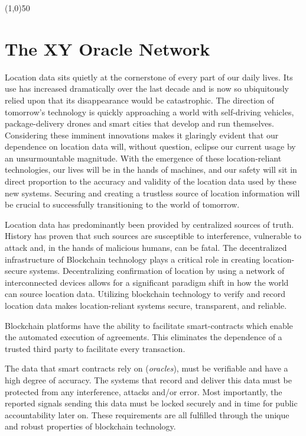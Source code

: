 \documentclass{article}
\begin{document}
\begin{center}
\line(1,0){50}
\end{center}

\section{The XY Oracle Network}

Location data sits quietly at the cornerstone of every part of our daily lives. Its use has increased dramatically over the last decade and is now so ubiquitously relied upon that its disappearance would be catastrophic. The direction of tomorrow's technology is quickly approaching a world with self-driving vehicles, package-delivery drones and smart cities that develop and run themselves. Considering these imminent innovations makes it glaringly evident that our dependence on location data will, without question, eclipse our current usage by an unsurmountable magnitude. With the emergence of these location-reliant technologies, our lives will be in the hands of machines, and our safety will sit in direct proportion to the \gls{accuracy} and validity of the location data used by these new systems. Securing and creating a \gls{trustless} source of location information will be crucial to successfully transitioning to the world of tomorrow.

Location data has predominantly been provided by centralized sources of truth. History has proven that such sources are susceptible to interference, vulnerable to attack and, in the hands of malicious humans, can be fatal. The decentralized infrastructure of Blockchain technology plays a critical role in creating location-secure systems. Decentralizing confirmation of location by using a network of interconnected devices allows for a significant paradigm shift in how the world can source location data. Utilizing blockchain technology to verify and record location data makes location-reliant systems secure, transparent, and reliable.

Blockchain platforms have the ability to facilitate \glspl{smart-contract} which enable the automated execution of agreements. This eliminates the dependence of a trusted third party to facilitate every transaction.

The data that smart contracts rely on (\textit{\glspl{oracle}}), must be verifiable and have a high degree of accuracy. The systems that record and deliver this data must be protected from any interference, attacks and/or error. Most importantly, the reported signals sending this data must be locked securely and in time for public accountability later on. These requirements are all fulfilled through the unique and robust properties of blockchain technology.
\end{document}
